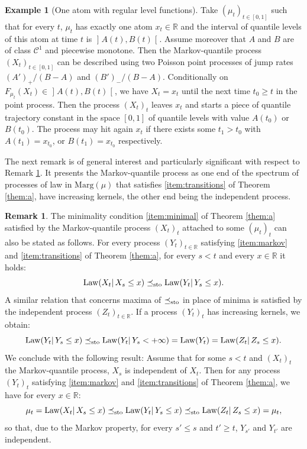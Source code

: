 \documentclass[JEP,XML,SOM,Unicode,NoEqCountersInSection,NoFloatCountersInSection,published]{cedram}
\theoremstyle{plain}
\theoremstyle{definition}
\newtheorem{rem}[them]{Remark}
\newtheorem{ex}[them]{Example}
\newcommand{\ma}{\mathrm{Marg}}
\newcommand{\R}{\mathbb{R}}
\newcommand{\law}{\operatorname{Law}}
\newcommand{\leqs}{\preceq_{\text{\rm sto}}}
\newcommand{\op}{\mathopen}
\newcommand{\clo}{\mathclose}
\begin{document}

\begin{ex}[One atom with regular level functions]\label{ex:swimming_atom}
Take $(\mu_t)_{t\in{[0,1]}}$ such that for every $t$, $\mu_t$ has exactly one atom $x_t\in \R$ and the interval of quantile levels of this atom at time $t$ is $\op]A(t),B(t)\clo[$. Assume moreover that $A$ and $B$ are of class $\mathcal{C}^1$ and piecewise monotone. Then the Markov-quantile process $(X_t)_{t\in [0,1]}$ can be described using two Poisson point processes of jump rates $(A')_+/(B-A)$ and $(B')_-/(B-A)$. Conditionally on $F_{\mu_t}(X_t)\in \op]A(t), B(t)\clo[$, we have $X_t=x_t$ until the next time $t_0\geq t$ in the point process. Then the process $(X_t)_t$ leaves $x_t$ and starts a piece of quantile trajectory constant in the space $[0,1]$ of quantile levels with value $A(t_0)$ or $B(t_0)$. The process may hit again $x_t$ if there exists some $t_1>t_0$ with $A(t_1)=x_{t_0}$, or $B(t_1)=x_{t_0}$ respectively.
\end{ex}

The next remark is of general interest and particularly significant with respect to Remark \ref{rem:a_bouger}. It presents the Markov-quantile process as one end of the spectrum of processes of law in $\ma(\mu)$ that satisfies \eqref{item:transitions} of Theorem \ref{them:a}, \ie have increasing kernels, the other end being the independent process.

\begin{rem}\label{rem:a_bouger}
The minimality condition \eqref{item:minimal} of Theorem \ref{them:a} satisfied by the Markov-quantile process $(X_t)_t$ attached to some $(\mu_t)_t$ can also be stated as follows. For every process $(Y_t)_{t\in \R}$ satisfying \eqref{item:markov} and \eqref{item:transitions} of Theorem \ref{them:a}, for every $s<t$ and every $x\in \R$ it holds:
\[
\law(X_t|\,X_s\leq x)\leqs \law(Y_t|\,Y_s\leq x).
\]
A similar relation that concerns maxima of $\leqs$ in place of minima is satisfied by the independent process $(Z_t)_{t\in \R}$. If a process $(Y_t)_t$ has increasing kernels, we obtain:
\[\law(Y_t|\,Y_s\leq x)\leqs \law(Y_t|\,Y_s< +\infty)=\law(Y_t)=\law(Z_t|\,Z_s\leq x).\]
We conclude with the following result: Assume that for some $s<t$ and $(X_t)_t$ the Markov-quantile process, $X_s$ is independent of $X_t$. Then for any process $(Y_t)_t$ satisfying \eqref{item:markov} and \eqref{item:transitions} of Theorem \ref{them:a}, we have for every $x\in\R$:\vspace*{-3pt}
\[
\mu_t=\law(X_t|\,X_s\leq x)\leqs \law(Y_t|\,Y_s\leq x) \leqs \law(Z_t|\,Z_s\leq x)=\mu_t,
\]
so that, due to the Markov property, for every $s'\leq s$ and $t'\geq t$, $Y_{s'}$ and $Y_{t'}$ are independent.
\end{rem}
\end{document}
